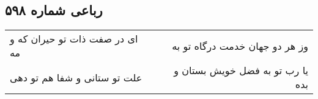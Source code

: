 \begin{center}
\section*{رباعی شماره ۵۹۸}
\label{sec:sh598}
\begin{longtable}{l p{0.5cm} r}
ای در صفت ذات تو حیران که و مه
&&
وز هر دو جهان خدمت درگاه تو به
\\
علت تو ستانی و شفا هم تو دهی
&&
یا رب تو به فضل خویش بستان و بده
\\
\end{longtable}
\end{center}
